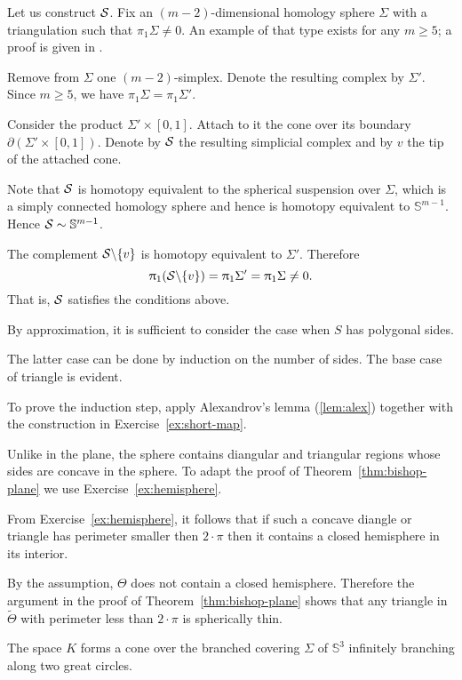 Let us construct $\mathcal{S}$.
Fix an $(m-2)$-dimensional homology sphere $\Sigma$ with a triangulation such that $\pi_1\Sigma\ne0$.
An example of that type exists for any $m\ge 5$; a proof is given in \cite{kervaire}.

Remove from $\Sigma$ one $(m-2)$-simplex.
Denote the resulting complex by $\Sigma'$.
Since $m\ge 5$, we have $\pi_1\Sigma=\pi_1\Sigma'$.

Consider the product $\Sigma'\times [0,1]$. 
Attach to it the cone over its boundary $\partial (\Sigma'\times [0,1])$.
Denote by $\mathcal{S}$ the resulting simplicial complex
and by $v$ the tip of the attached cone.

Note that $\mathcal{S}$ is homotopy equivalent to the spherical suspension over $\Sigma$, which is a simply connected homology sphere and hence is homotopy equivalent to $\mathbb{S}^{m-1}$.
  Hence  $\mathcal{S}\sim\mathbb{S}^{m-1}$.

The complement $\mathcal{S}\backslash\{v\}$ is homotopy equivalent to $\Sigma'$.
Therefore 
\[
\uppi_1(\mathcal{S}\backslash\{v\})
=\uppi_1\Sigma'
=\uppi_1\Sigma\ne 0.
\]
That is, $\mathcal{S}$ satisfies the conditions above.
\qeds

By approximation,
it is sufficient to consider the case when $S$ has polygonal sides.

The latter case can be done by induction on the number of sides.
The base case of triangle is evident.

To prove the induction step, apply Alexandrov's lemma (\ref{lem:alex}) 
together with the construction in Exercise~\ref{ex:short-map}.
\qeds

Unlike in the plane, the sphere contains diangular and triangular regions whose sides are concave in the sphere.
To adapt the proof of Theorem~\ref{thm:bishop-plane}
we use Exercise~\ref{ex:hemisphere}.

From  Exercise~\ref{ex:hemisphere}, it follows that if such a concave diangle or triangle has perimeter smaller then $2\cdot\pi$ then it contains a closed hemisphere in its interior.

By the assumption, $\Theta$ does not contain a closed hemisphere. 
Therefore the argument in the proof of Theorem~\ref{thm:bishop-plane} shows that any triangle in $\tilde\Theta$ with perimeter less than $2\cdot\pi$ is spherically thin. 
\qeds


The space $K$ forms a cone over the branched covering $\Sigma$ of $\mathbb{S}^3$ infinitely branching along two great circles.

